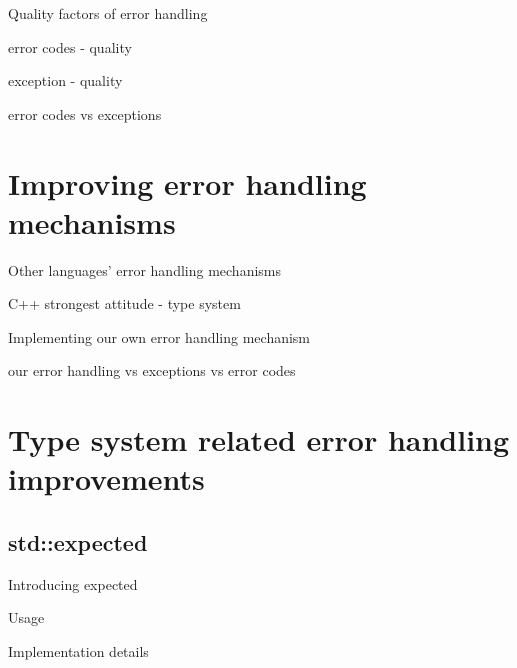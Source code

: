 \documentclass[10pt,a4paper]{beamer}
\begin{document}
\begin{frame}{Quality factors of error handling}
\end{frame}

\begin{frame}{error codes - quality}
\end{frame}

\begin{frame}{exception - quality}
\end{frame}

\begin{frame}{error codes vs exceptions}	
\end{frame}

\section{Improving error handling mechanisms}
	
\begin{frame}{Other languages' error handling mechanisms}
\end{frame}

\begin{frame}{C++ strongest attitude - type system}
\end{frame}

\begin{frame}{Implementing our own error handling mechanism}
\end{frame}
	
\begin{frame}{our error handling vs exceptions vs error codes}
\end{frame}
	
\section{Type system related error handling improvements}

\subsection{std::expected}
\begin{frame}{Introducing expected}
\end{frame}

\begin{frame}{Usage}
\end{frame}

\begin{frame}{Implementation details}
\end{frame}
\end{document}
